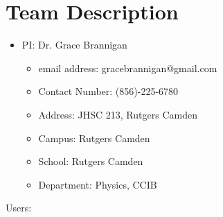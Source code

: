 \documentclass[oneside]{report}
\begin{document}
\section*{Team Description}
    \begin{itemize}
    	\item PI: Dr. Grace Brannigan
	\begin{itemize}
	\item email address: gracebrannigan@gmail.com
	\item Contact Number: (856)-225-6780
	\item Address: JHSC 213, Rutgers Camden
	\item Campus: Rutgers Camden
	\item School: Rutgers Camden
	\item Department: Physics, CCIB
    \end{itemize}
    \end{itemize}
    Users:
\end{document}
